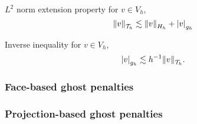 \begin{assumption}[EP3]
    \label{as:EP3}
    $L^{2}$ norm extension property for $v \in V_{h}$,\[
    \| v \|_{ \mathcal{T} _{h} }^{  } \lesssim \| v  \|_{H_{h}  }^{  }   + \left\lvert  v  \right\rvert _{g_{h}}
    \]
\end{assumption}

\begin{assumption}[EP4]
    \label{as:EP4}
    Inverse inequality for $v \in  V_{h}$,
    \[
    \left\lvert  v  \right\rvert _{g_{h}} \lesssim h^{-1} \| v \|_{ \mathcal{T} _{h} }^{  } .
    \]
\end{assumption}



\subsubsection{Face-based ghost penalties}%
\label{ssub:face_based_ghost_penalties}

\subsubsection{Projection-based ghost penalties}%
\label{ssub:projection_based_ghost_penalties}


